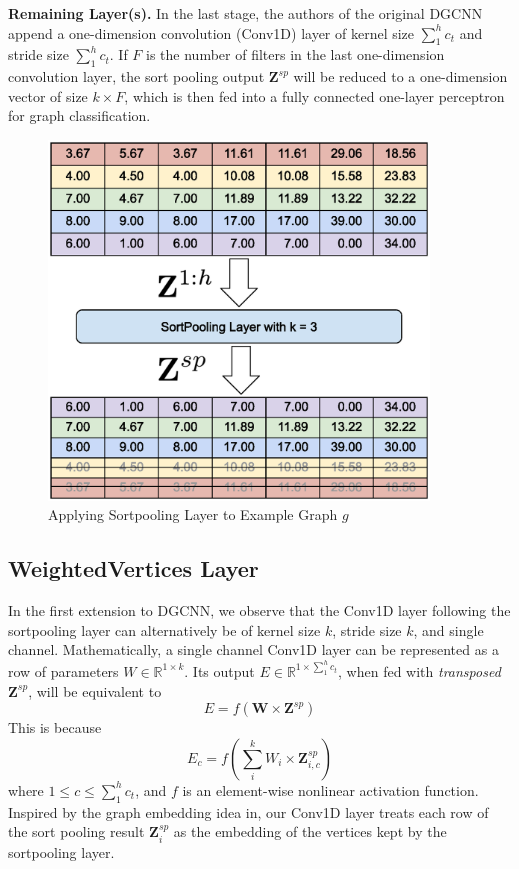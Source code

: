 \textbf{Remaining Layer(s).} In the last stage, the authors of the original DGCNN\cite{Dgcnn} append a one-dimension convolution (Conv1D) layer of kernel size $\sum_{1}^{h}c_t$ and stride size $\sum_{1}^{h}c_t$.
If $F$ is the number of filters in the last one-dimension convolution layer, the sort pooling output $\mathbf{Z}^{sp}$ will be reduced to a one-dimension vector of size $k \times F$, which is then fed into a fully connected one-layer perceptron for graph classification.

\begin{figure}[htbp]
\centerline{\includegraphics[width=0.90\textwidth]{Magic/figures/ExampleSortpool.eps}}
\caption{Applying Sortpooling Layer to Example Graph $g$}
\label{MG:Fig:ExampleSortpool}
\end{figure}

\subsection{WeightedVertices Layer}
In the first extension to DGCNN, we observe that the Conv1D layer following the sortpooling layer can alternatively be of kernel size $k$, stride size $k$, and single channel.
Mathematically, a single channel Conv1D layer can be represented as a row of parameters $W \in \mathbb{R}^{1 \times k}$.
Its output $E \in \mathbb{R}^{1 \times \sum_{1}^{h}c_t}$, when fed with \textit{transposed} $\mathbf{Z}^{sp}$, will be equivalent to
\begin{equation}
    E = f(\mathbf{W} \times \mathbf{Z}^{sp})
\label{MG:Equ:WeightedVertices}
\end{equation}
This is because
\begin{equation}
    E_c = f(\sum_{i}^{k} W_i \times \mathbf{Z}^{sp}_{i, c})
\end{equation}
where $1\leq c \leq \sum_{1}^{h}c_t$, and $f$ is an element-wise nonlinear activation function.
Inspired by the graph embedding idea in\cite{GraphEmbedding}, our Conv1D layer treats each row of the sort pooling result $\mathbf{Z}^{sp}_{i}$ as the embedding of the vertices kept by the sortpooling layer.

